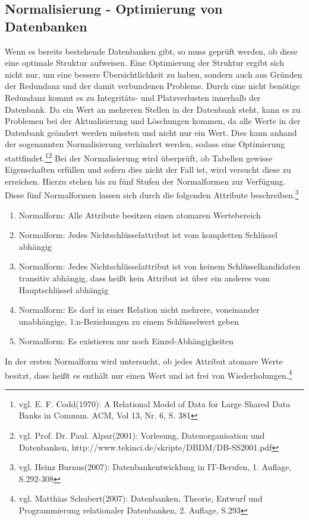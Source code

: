 \subsection{Normalisierung - Optimierung von Datenbanken}
\label{secNormalisierung}
Wenn es bereits bestehende Datenbanken gibt, so muss geprüft werden, ob diese eine optimale Struktur aufweisen.
Eine Optimierung der Struktur ergibt sich nicht nur, um eine bessere Übersichtlichkeit zu haben, sondern auch aus Gründen der Redundanz und der damit verbundenen Probleme.
Durch eine nicht benötige Redundanz kommt es zu Integritäts- und Platzverlusten innerhalb der Datenbank.
Da ein Wert an mehreren Stellen in der Datenbank steht, kann es zu Problemen bei der Aktualisierung und Löschungen kommen, da alle Werte in der Datenbank geändert werden müssten und nicht nur ein Wert.
Dies kann anhand der sogenannten Normalisierung verhindert werden, sodass eine Optimierung stattfindet.\footnote{vgl. E. F. Codd(1970): A Relational Model of Data for Large Shared Data Banks in Commun. ACM, Vol 13, Nr. 6, S. 381}\footnote{vgl. Prof. Dr. Paul. Alpar(2001): Vorlesung, Datenorganisation und Datenbanken,  http://www.tekinci.de/skripte/DBDM/DB-SS2001.pdf}
Bei der Normalisierung wird überprüft, ob Tabellen gewisse Eigenschaften erfüllen und sofern dies nicht der Fall ist, wird versucht diese zu erreichen.
Hierzu stehen bis zu fünf Stufen der Normalformen zur Verfügung.
Diese fünf Normalformen lassen sich durch die folgenden Attribute beschreiben.\footnote{vgl. Heinz Burnus(2007): Datenbankentwicklung in IT-Berufen, 1. Auflage, S.292-308}

\begin{enumerate}
\item Normalform: Alle Attribute besitzen einen atomaren Wertebereich
\item Normalform: Jedes Nichtschlüsselattribut ist vom kompletten Schlüssel abhängig
\item Normalform: Jedes Nichtschlüsselattribut ist von keinem Schlüsselkandidaten transitiv abhängig, dass heißt kein Attribut ist über ein anderes vom Hauptschlüssel abhängig
\item Normalform: Es darf in einer Relation nicht mehrere, voneinander unabhängige, 1:n-Beziehungen zu einem Schlüsselwert geben
\item Normalform: Es existieren nur noch Einzel-Abhängigkeiten
\end{enumerate}


In der ersten Normalform wird untersucht, ob jedes Attribut atomare Werte besitzt, dass heißt es enthält nur einen Wert und ist frei von Wiederholungen.\footnote{vgl. Matthias Schubert(2007): Datenbanken, Theorie, Entwurf und Programmierung relationaler Datenbanken, 2. Auflage, S.293}


